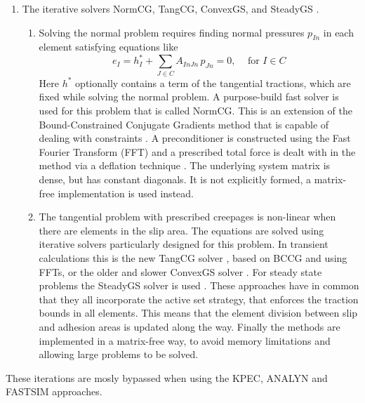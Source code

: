 \documentclass[12pt]{report}
\begin{document}
\begin{enumerate}
\item\label{itm:it_solvers} The iterative solvers NormCG, TangCG, 
        ConvexGS, and SteadyGS \cite{Vollebregt2014a-fftprec, 
        Zhao_Jing2015a-tangcg,Vollebregt1995a-convexgs,
        Vollebregt2010c-cst2010}.
\begin{enumerate}
\item Solving the normal problem requires finding normal pressures
        $p_{In}$ in each element satisfying equations like
        \begin{equation}
         e_I = h^*_I + \sum_{J\in C} A_{InJn} \, p_{Jn} = 0,
                                        \;\;\;\mbox{ for } I\in C
        \end{equation}
        Here $h^*$ optionally contains a term of the tangential tractions,
        which are fixed while solving the normal problem. A purpose-build
        fast solver is used for this problem that is called NormCG.
        This is an extension of the Bound-Constrained Conjugate Gradients
        method that is capable of dealing with constraints
        \cite{Vollebregt2014b-bccg}. A preconditioner is constructed using
        the Fast Fourier Transform (FFT) and a prescribed total force is
        dealt with in the method via a deflation technique
        \cite{Vollebregt2014a-fftprec}.
        The underlying system matrix is dense, but has constant diagonals. It
        is not explicitly formed, a matrix-free implementation is used
        instead.
\item The tangential problem with prescribed creepages is non-linear when
        there are elements in the slip area. The equations are solved using
        iterative solvers particularly designed for this problem. In
        transient calculations this is the new TangCG solver
        \cite{Zhao_Jing2015a-tangcg}, based on BCCG and using FFTs, or the
        older and slower ConvexGS solver \cite{Vollebregt1995a-convexgs}.
        For steady state problems the SteadyGS solver is used 
        \cite{Vollebregt2010c-cst2010}. These approaches have in common
        that they all incorporate the active set strategy, that enforces
        the traction bounds in all elements. This means that the element
        division between slip and adhesion areas is updated along the way.
        Finally the methods are implemented in a matrix-free way, to avoid
        memory limitations and allowing large problems to be solved.
\end{enumerate}

\end{enumerate}
These iterations are mosly bypassed when using the KPEC, ANALYN and FASTSIM
approaches. 
\end{document}

